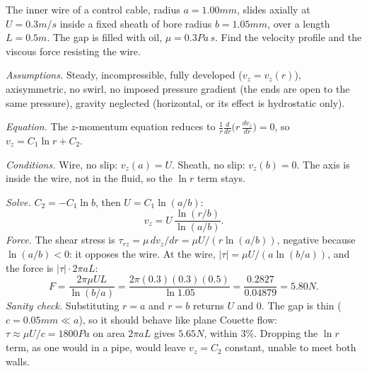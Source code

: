\begin{example}
The inner wire of a control cable, radius $a = 1.00\unit{mm}$, slides axially at $U = 0.3\unit{m/s}$ inside a fixed sheath of bore radius $b = 1.05\unit{mm}$, over a length $L = 0.5\unit{m}$. The gap is filled with oil, $\mu = 0.3\unit{Pa\,s}$. Find the velocity profile and the viscous force resisting the wire.

\emph{Assumptions.} Steady, incompressible, fully developed ($v_z = v_z(r)$), axisymmetric, no swirl, no imposed pressure gradient (the ends are open to the same pressure), gravity neglected (horizontal, or its effect is hydrostatic only).

\emph{Equation.} The $z$-momentum equation reduces to $\frac{1}{r}\frac{d}{dr}\big(r\,\frac{dv_z}{dr}\big) = 0$, so $v_z = C_1\ln r + C_2$.

\emph{Conditions.} Wire, no slip: $v_z(a) = U$. Sheath, no slip: $v_z(b) = 0$. The axis is inside the wire, not in the fluid, so the $\ln r$ term stays.

\emph{Solve.} $C_2 = -C_1\ln b$, then $U = C_1\ln(a/b)$:
\[
v_z = U\,\frac{\ln(r/b)}{\ln(a/b)} .
\]
\emph{Force.} The shear stress is $\tau_{rz} = \mu\,dv_z/dr = \mu U/(r\ln(a/b))$, negative because $\ln(a/b) < 0$: it opposes the wire. At the wire, $|\tau| = \mu U/(a\ln(b/a))$, and the force is $|\tau|\cdot 2\pi aL$:
\[
F = \frac{2\pi\mu UL}{\ln(b/a)} = \frac{2\pi(0.3)(0.3)(0.5)}{\ln 1.05} = \frac{0.2827}{0.04879} = 5.80\unit{N}.
\]
\emph{Sanity check.} Substituting $r = a$ and $r = b$ returns $U$ and $0$. The gap is thin ($c = 0.05\unit{mm} \ll a$), so it should behave like plane Couette flow: $\tau \approx \mu U/c = 1800\unit{Pa}$ on area $2\pi aL$ gives $5.65\unit{N}$, within $3\%$. Dropping the $\ln r$ term, as one would in a pipe, would leave $v_z = C_2$ constant, unable to meet both walls.
\end{example}

